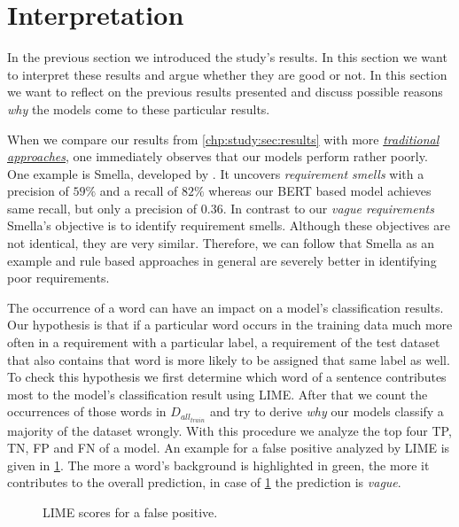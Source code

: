 \section{Interpretation}
\label{chp:study:sec:interpretation}
In the previous section we introduced the study's results.
In this section we want to interpret these results and argue whether they are good or not.
In this section we want to reflect on the previous results presented and discuss possible reasons \textit{why} the models come to these particular results.

When we compare our results from \cref{chp:study:sec:results} with more \hyperref[chp:related_research:sec:rule_based approaches]{\textit{traditional approaches}}, one immediately observes that our models perform rather poorly.
One example is Smella, developed by \textcite{Femmer:2017}.
It uncovers \textit{requirement smells} with a precision of $59\%$ and a recall of $82\%$ whereas our \ac{BERT} based model achieves same recall, but only a precision of $0.36$.
In contrast to our \textit{vague requirements} Smella's objective is to identify requirement smells.
Although these objectives are not identical, they are very similar.
Therefore, we can follow that Smella as an example and rule based approaches in general are severely better in identifying poor requirements.

The occurrence of a word can have an impact on a model's classification results.
Our hypothesis is that if a particular word occurs in the training data much more often in a requirement with a particular label, a requirement of the test dataset that also contains that word is more likely to be assigned that same label as well.
To check this hypothesis we first determine which word of a sentence contributes most to the model's classification result using \ac{LIME}.
After that we count the occurrences of those words in $D_{all_{train}}$ and try to derive \textit{why} our models classify a majority of the dataset wrongly.
With this procedure we analyze the top four \ac{TP}, \ac{TN}, \ac{FP} and \ac{FN} of a model.
An example for a false positive analyzed by \ac{LIME} is given in \cref{fig:study:interpretation:LIME}.
The more a word's background is highlighted in green, the more it contributes to the overall prediction, in case of \cref{fig:study:interpretation:LIME} the prediction is \textit{vague}.
\begin{figure}[htpb]
    \centering
    \def\svgwidth{\columnwidth}
    
    \caption[Study Interpretation: Example for LIME]{LIME scores for a false positive.}\label{fig:study:interpretation:LIME}
\end{figure}

